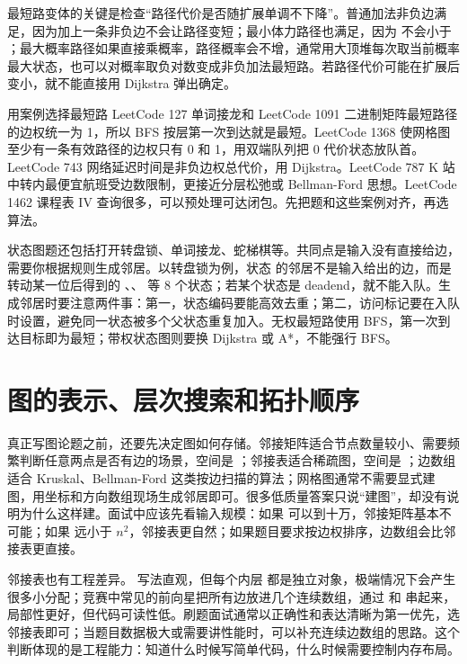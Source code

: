 最短路变体的关键是检查“路径代价是否随扩展单调不下降”。普通加法非负边满足，因为加上一条非负边不会让路径变短；最小体力路径也满足，因为  不会小于 ；最大概率路径如果直接乘概率，路径概率会不增，通常用大顶堆每次取当前概率最大状态，也可以对概率取负对数变成非负加法最短路。若路径代价可能在扩展后变小，就不能直接用 Dijkstra 弹出确定。

\begin{principlebox}{用案例选择最短路}
LeetCode 127 单词接龙和 LeetCode 1091 二进制矩阵最短路径的边权统一为 1，所以 BFS 按层第一次到达就是最短。LeetCode 1368 使网格图至少有一条有效路径的边权只有 0 和 1，用双端队列把 0 代价状态放队首。LeetCode 743 网络延迟时间是非负边权总代价，用 Dijkstra。LeetCode 787 K 站中转内最便宜航班受边数限制，更接近分层松弛或 Bellman-Ford 思想。LeetCode 1462 课程表 IV 查询很多，可以预处理可达闭包。先把题和这些案例对齐，再选算法。
\end{principlebox}

状态图题还包括打开转盘锁、单词接龙、蛇梯棋等。共同点是输入没有直接给边，需要你根据规则生成邻居。以转盘锁为例，状态  的邻居不是输入给出的边，而是转动某一位后得到的 、、 等 8 个状态；若某个状态是 deadend，就不能入队。生成邻居时要注意两件事：第一，状态编码要能高效去重；第二，访问标记要在入队时设置，避免同一状态被多个父状态重复加入。无权最短路使用 BFS，第一次到达目标即为最短；带权状态图则要换 Dijkstra 或 A*，不能强行 BFS。

\section{图的表示、层次搜索和拓扑顺序}

真正写图论题之前，还要先决定图如何存储。邻接矩阵适合节点数量较小、需要频繁判断任意两点是否有边的场景，空间是 ；邻接表适合稀疏图，空间是 ；边数组适合 Kruskal、Bellman-Ford 这类按边扫描的算法；网格图通常不需要显式建图，用坐标和方向数组现场生成邻居即可。很多低质量答案只说“建图”，却没有说明为什么这样建。面试中应该先看输入规模：如果  可以到十万，邻接矩阵基本不可能；如果  远小于 \ensuremath{n^2}，邻接表更自然；如果题目要求按边权排序，边数组会比邻接表更直接。

邻接表也有工程差异。  写法直观，但每个内层  都是独立对象，极端情况下会产生很多小分配；竞赛中常见的前向星把所有边放进几个连续数组，通过  和  串起来，局部性更好，但代码可读性低。刷题面试通常以正确性和表达清晰为第一优先，选  邻接表即可；当题目数据极大或需要讲性能时，可以补充连续边数组的思路。这个判断体现的是工程能力：知道什么时候写简单代码，什么时候需要控制内存布局。


